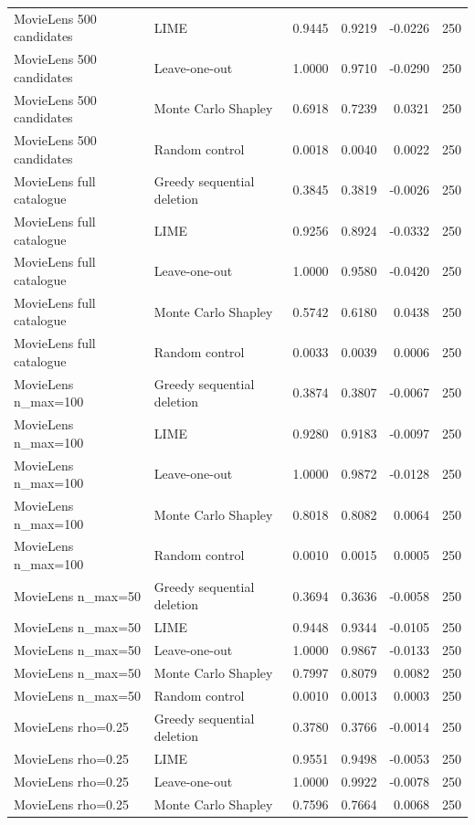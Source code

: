 \begin{longtable}{@{}p{.24\linewidth}p{.17\linewidth}rrrr@{}}
MovieLens 500 candidates & LIME & 0.9445 & 0.9219 & -0.0226 & 250 \\
MovieLens 500 candidates & Leave-one-out & 1.0000 & 0.9710 & -0.0290 & 250 \\
MovieLens 500 candidates & Monte Carlo Shapley & 0.6918 & 0.7239 & 0.0321 & 250 \\
MovieLens 500 candidates & Random control & 0.0018 & 0.0040 & 0.0022 & 250 \\
MovieLens full catalogue & Greedy sequential deletion & 0.3845 & 0.3819 & -0.0026 & 250 \\
MovieLens full catalogue & LIME & 0.9256 & 0.8924 & -0.0332 & 250 \\
MovieLens full catalogue & Leave-one-out & 1.0000 & 0.9580 & -0.0420 & 250 \\
MovieLens full catalogue & Monte Carlo Shapley & 0.5742 & 0.6180 & 0.0438 & 250 \\
MovieLens full catalogue & Random control & 0.0033 & 0.0039 & 0.0006 & 250 \\
MovieLens n\_max=100 & Greedy sequential deletion & 0.3874 & 0.3807 & -0.0067 & 250 \\
MovieLens n\_max=100 & LIME & 0.9280 & 0.9183 & -0.0097 & 250 \\
MovieLens n\_max=100 & Leave-one-out & 1.0000 & 0.9872 & -0.0128 & 250 \\
MovieLens n\_max=100 & Monte Carlo Shapley & 0.8018 & 0.8082 & 0.0064 & 250 \\
MovieLens n\_max=100 & Random control & 0.0010 & 0.0015 & 0.0005 & 250 \\
MovieLens n\_max=50 & Greedy sequential deletion & 0.3694 & 0.3636 & -0.0058 & 250 \\
MovieLens n\_max=50 & LIME & 0.9448 & 0.9344 & -0.0105 & 250 \\
MovieLens n\_max=50 & Leave-one-out & 1.0000 & 0.9867 & -0.0133 & 250 \\
MovieLens n\_max=50 & Monte Carlo Shapley & 0.7997 & 0.8079 & 0.0082 & 250 \\
MovieLens n\_max=50 & Random control & 0.0010 & 0.0013 & 0.0003 & 250 \\
MovieLens rho=0.25 & Greedy sequential deletion & 0.3780 & 0.3766 & -0.0014 & 250 \\
MovieLens rho=0.25 & LIME & 0.9551 & 0.9498 & -0.0053 & 250 \\
MovieLens rho=0.25 & Leave-one-out & 1.0000 & 0.9922 & -0.0078 & 250 \\
MovieLens rho=0.25 & Monte Carlo Shapley & 0.7596 & 0.7664 & 0.0068 & 250 \\

\end{longtable}

